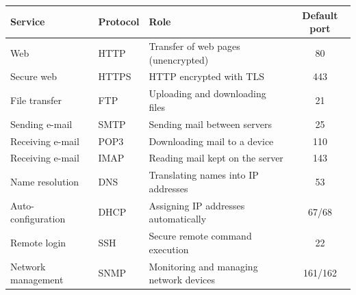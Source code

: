\documentclass[11pt]{article}
\begin{document}
\begin{center}
\begin{tabularx}{\linewidth}{|l|l|X|c|}
\hline
\rowcolor{popblueL} \textbf{Service} & \textbf{Protocol} & \textbf{Role} & \textbf{Default port} \\
\hline
Web & HTTP & Transfer of web pages (unencrypted) & 80 \\
\hline
\rowcolor{popgreenL} Secure web & HTTPS & HTTP encrypted with TLS & 443 \\
\hline
File transfer & FTP & Uploading and downloading files & 21 \\
\hline
\rowcolor{popgreenL} Sending e-mail & SMTP & Sending mail between servers & 25 \\
\hline
Receiving e-mail & POP3 & Downloading mail to a device & 110 \\
\hline
\rowcolor{popgreenL} Receiving e-mail & IMAP & Reading mail kept on the server & 143 \\
\hline
Name resolution & DNS & Translating names into IP addresses & 53 \\
\hline
\rowcolor{popgreenL} Auto-configuration & DHCP & Assigning IP addresses automatically & 67/68 \\
\hline
Remote login & SSH & Secure remote command execution & 22 \\
\hline
\rowcolor{popgreenL} Network management & SNMP & Monitoring and managing network devices & 161/162 \\
\hline
\end{tabularx}
\end{center}
\end{document}

